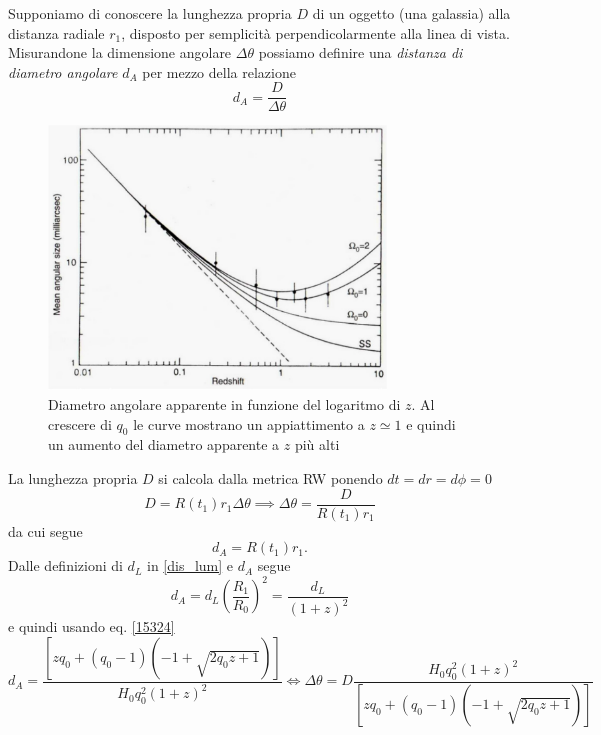 Supponiamo di conoscere la lunghezza propria $D$ di un oggetto (una galassia)
alla distanza radiale $r_1$, disposto per semplicità perpendicolarmente alla
linea di vista.  Misurandone la dimensione angolare $\Delta \theta$ possiamo
definire una \emph{distanza di diametro angolare} $d_A$ per mezzo della
relazione
\begin{equation}
  d_A = \frac{D}{\Delta \theta}
\end{equation}
\begin{figure}
  \centering{}
  \includegraphics[width=0.8\textwidth]{figure/diametri_angolari_1.pdf}
  \caption{Diametro angolare apparente in funzione del logaritmo di $z$.  Al
    crescere di $q_0$ le curve mostrano un appiattimento a $z \simeq 1$ e quindi
    un aumento del diametro apparente a $z$ più alti}
  \label{diam_angolari_1}
\end{figure}
La lunghezza propria $D$ si calcola dalla metrica RW ponendo $dt=dr=d\phi=0$
\begin{equation}
  D= R(t_1) r_1 \Delta \theta  \implies \Delta \theta = \frac{D} {R(t_1) r_1}
\end{equation}
da cui segue
\begin{equation}
  d_A= R(t_1) r_1.
\end{equation}
Dalle definizioni di $d_L$ in \eqref{dis_lum} e $d_A$ segue
\begin{equation}
  d_A = d_L \left( \frac{R_1}{R_0} \right)^2 = \frac{d_L}{(1+z)^2}
\end{equation}
e quindi usando eq. \eqref{15324}
\begin{equation}
  d_A = \frac { \left[ z q_0 +(q_0-1) (-1+\sqrt{2q_0z+1}) \right] }  {H_0 q^2_0
    (1+z)^2}
  \iff
  \Delta \theta  = D \frac{H_0 q^2_0 (1+z)^2} {\left[ z q_0 +(q_0-1)
      (-1+\sqrt{2q_0z+1}) \right]}
\end{equation}

